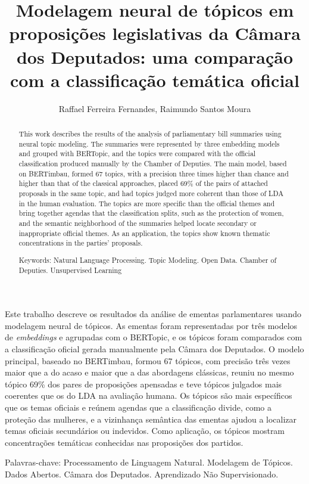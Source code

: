 \documentclass[12pt]{article}
\title{Modelagem neural de tópicos em proposições legislativas da Câmara dos Deputados: uma comparação com a classificação temática oficial}
\author{Raffael Ferreira Fernandes\inst{1}, Raimundo Santos Moura }
\begin{document}
\raggedbottom

\maketitle

\begin{resumo}
  \small
  Este trabalho descreve os resultados da análise de ementas parlamentares usando modelagem neural de tópicos. As ementas foram representadas por três modelos de \textit{embeddings} e agrupadas com o BERTopic, e os tópicos foram comparados com a classificação oficial gerada manualmente pela Câmara dos Deputados. O modelo principal, baseado no BERTimbau, formou 67 tópicos, com precisão três vezes maior que a do acaso e maior que a das abordagens clássicas, reuniu no mesmo tópico 69\% dos pares de proposições apensadas e teve tópicos julgados mais coerentes que os do LDA na avaliação humana. Os tópicos são mais específicos que os temas oficiais e reúnem agendas que a classificação divide, como a proteção das mulheres, e a vizinhança semântica das ementas ajudou a localizar temas oficiais secundários ou indevidos. Como aplicação, os tópicos mostram concentrações temáticas conhecidas nas proposições dos partidos.

  \vspace{1em}
  \noindent Palavras-chave: Processamento de Linguagem Natural. Modelagem de Tópicos. Dados Abertos. Câmara dos Deputados. Aprendizado Não Supervisionado.
\end{resumo}

\begin{abstract}
  \small
  This work describes the results of the analysis of parliamentary bill summaries using neural topic modeling. The summaries were represented by three embedding models and grouped with BERTopic, and the topics were compared with the official classification produced manually by the Chamber of Deputies. The main model, based on BERTimbau, formed 67 topics, with a precision three times higher than chance and higher than that of the classical approaches, placed 69\% of the pairs of attached proposals in the same topic, and had topics judged more coherent than those of LDA in the human evaluation. The topics are more specific than the official themes and bring together agendas that the classification splits, such as the protection of women, and the semantic neighborhood of the summaries helped locate secondary or inappropriate official themes. As an application, the topics show known thematic concentrations in the parties' proposals.

  \vspace{1em}
  \noindent Keywords: Natural Language Processing. Topic Modeling. Open Data. Chamber of Deputies. Unsupervised Learning
\end{abstract}
\end{document}
